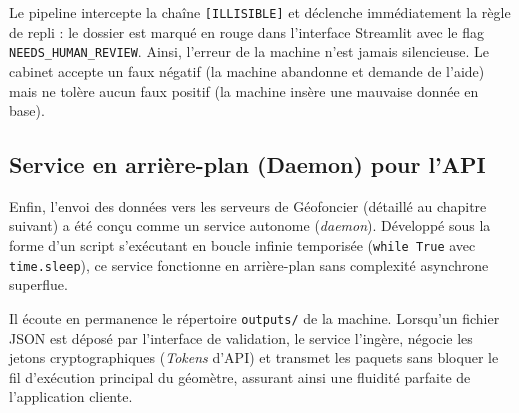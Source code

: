Le pipeline intercepte la chaîne \texttt{[ILLISIBLE]} et déclenche immédiatement la règle de repli : le dossier est marqué en rouge dans l'interface Streamlit avec le flag \texttt{NEEDS\_HUMAN\_REVIEW}. Ainsi, l'erreur de la machine n'est jamais silencieuse. Le cabinet accepte un faux négatif (la machine abandonne et demande de l'aide) mais ne tolère aucun faux positif (la machine insère une mauvaise donnée en base).

\subsection{Service en arrière-plan (Daemon) pour l'API}

Enfin, l'envoi des données vers les serveurs de Géofoncier (détaillé au chapitre suivant) a été conçu comme un service autonome (\textit{daemon}). Développé sous la forme d'un script s'exécutant en boucle infinie temporisée (\texttt{while True} avec \texttt{time.sleep}), ce service fonctionne en arrière-plan sans complexité asynchrone superflue.

Il écoute en permanence le répertoire \texttt{outputs/} de la machine. Lorsqu'un fichier JSON est déposé par l'interface de validation, le service l'ingère, négocie les jetons cryptographiques (\textit{Tokens} d'API) et transmet les paquets sans bloquer le fil d'exécution principal du géomètre, assurant ainsi une fluidité parfaite de l'application cliente.
